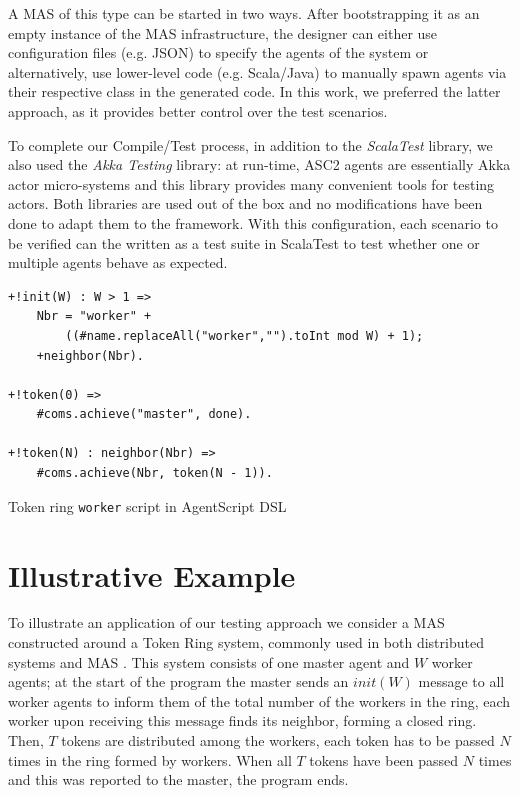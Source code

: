 A MAS of this type can be started in two ways. After bootstrapping it as an empty instance of the MAS infrastructure, the designer can either use configuration files (e.g. JSON) to specify the agents of the system or alternatively, use lower-level code (e.g. Scala/Java) to manually spawn agents via their respective class in the generated code. In this work, we preferred the latter approach, as it provides better control over the test scenarios.

To complete our Compile/Test process, in addition to the \textit{ScalaTest} library, we also used the \textit{Akka Testing} library: at run-time, ASC2 agents are essentially Akka actor micro-systems and this library provides many convenient tools for testing actors. Both libraries are used out of the box and no modifications have been done to adapt them to the framework. With this configuration, each scenario to be verified can the written as a test suite in ScalaTest to test whether one or multiple agents behave as expected.

\begin{listing}[!tb]

\centering
\begin{tcolorbox}[left=2pt,right=2pt,top=2pt,bottom=2pt,arc=0pt,
                  boxrule=0pt,toprule=1pt,
                  colback=white]
\begin{verbatim}
+!init(W) : W > 1 =>
    Nbr = "worker" + 
        ((#name.replaceAll("worker","").toInt mod W) + 1);
    +neighbor(Nbr).

+!token(0) =>
    #coms.achieve("master", done).

+!token(N) : neighbor(Nbr) =>
    #coms.achieve(Nbr, token(N - 1)).
\end{verbatim}
\end{tcolorbox}
    \caption{Token ring \texttt{worker} script in AgentScript DSL}
    \label{lst:script_1}

\end{listing}

\section{Illustrative Example}
\label{sec:example}
To illustrate an application of our testing approach we consider a MAS constructed around a Token Ring system, commonly used in both distributed systems and MAS \cite{MohajeriParizi2020,Cardoso2013}. This system consists of one master agent and $W$ worker agents; at the start of the program the master sends an $init(W)$ message to all worker agents to inform them of the total number of the workers in the ring, each worker upon receiving this message finds its neighbor, forming a closed ring. Then, $T$ tokens are distributed among the workers, each token has to be passed $N$ times in the ring formed by workers. When all $T$ tokens have been passed $N$ times and this was reported to the master, the program ends.

